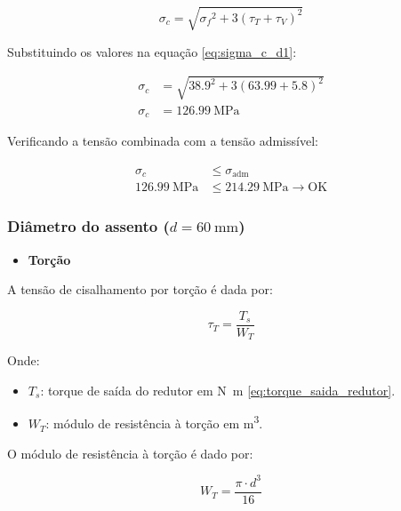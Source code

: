 \begin{equation}
  \sigma_c = \sqrt{{\sigma_f}^2 + 3 \left( \tau_T + \tau_V \right)^2}
  \label{eq:sigma_c_d1}
\end{equation}

Substituindo os valores na equação \eqref{eq:sigma_c_d1}:

\begin{align*}
  \sigma_c & = \sqrt{\num{38.9}^2 + 3 \left( \num{63.99} + \num{5.8} \right)^2} \\
  \sigma_c & = \boxed{\SI{126.99}{\mega\pascal}}
\end{align*}

Verificando a tensão combinada com a tensão admissível:

\begin{align*}
  \sigma_c                  & \leq \sigma_{\text{adm}}                             \\
  \SI{126.99}{\mega\pascal} & \leq \SI{214.29}{\mega\pascal} \rightarrow \text{OK}
\end{align*}

\subsubsection{Diâmetro do assento ($d = \SI{60}{\milli\meter}$)}

\begin{itemize}
  \item \textbf{Torção}
\end{itemize}

A tensão de cisalhamento por torção é dada por:

\begin{equation}
  \tau_T = \frac{T_s}{W_T}
  \label{eq:tau_T_d}
\end{equation}

Onde:

\begin{itemize}
  \item $T_s$: torque de saída do redutor em \si{\newton\meter} \eqref{eq:torque_saida_redutor}.
  \item $W_T$: módulo de resistência à torção em \si{\meter^3}.
\end{itemize}

\vspace{1em}

O módulo de resistência à torção é dado por:

\begin{equation}
  W_T = \frac{\pi \cdot {d}^3}{16}
  \label{eq:w_T_d}
\end{equation}

